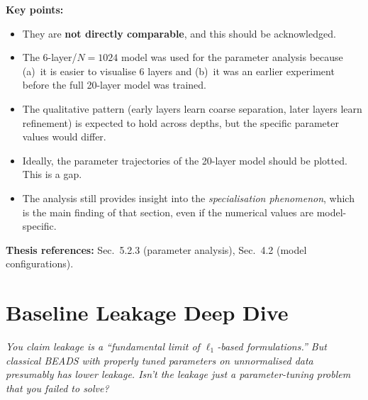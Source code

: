 \documentclass[11pt, letterpaper]{article}
\newcounter{qcounter}
\newcommand{\question}[1]{%
  \stepcounter{qcounter}%
  \begin{questionbox}[Q\theqcounter]%
    \itshape #1%
  \end{questionbox}%
}
\begin{document}
\begin{answerbox}
\textbf{Key points:}
\begin{itemize}[nosep]
  \item They are \textbf{not directly comparable}, and this should
        be acknowledged.
  \item The 6-layer/$N{=}1024$ model was used for the parameter
        analysis because (a)~it is easier to visualise 6 layers
        and (b)~it was an earlier experiment before the full
        20-layer model was trained.
  \item The qualitative pattern (early layers learn coarse separation,
        later layers learn refinement) is expected to hold across
        depths, but the specific parameter values would differ.
  \item Ideally, the parameter trajectories of the 20-layer model
        should be plotted.  This is a gap.
  \item The analysis still provides insight into the
        \emph{specialisation phenomenon}, which is the main finding
        of that section, even if the numerical values are
        model-specific.
\end{itemize}
\textbf{Thesis references:} Sec.~5.2.3 (parameter analysis), Sec.~4.2 (model configurations).
\end{answerbox}


\section{Baseline Leakage Deep Dive}

\question{You claim leakage is a ``fundamental limit of $\ell_1$-based
formulations.''  But classical BEADS with properly tuned parameters
on unnormalised data presumably has lower leakage.  Isn't the
leakage just a parameter-tuning problem that you failed to solve?}
\end{document}
